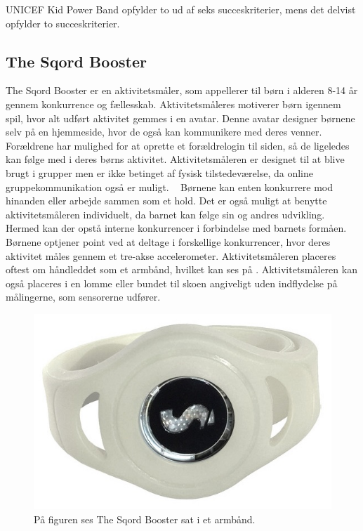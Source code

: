 UNICEF Kid Power Band opfylder to ud af seks succeskriterier, mens det delvist opfylder to succeskriterier.

\subsection{The Sqord Booster}
The Sqord Booster er en aktivitetsmåler, som appellerer til børn i alderen 8-14 år gennem konkurrence og fællesskab. Aktivitetsmåleres motiverer børn igennem spil, hvor alt udført aktivitet gemmes i en avatar. Denne avatar designer børnene selv på en hjemmeside, hvor de også kan kommunikere med deres venner. Forældrene har mulighed for at oprette et forældrelogin til siden, så de ligeledes kan følge med i deres børns aktivitet. Aktivitetsmåleren er designet til at blive brugt i grupper men er ikke betinget af fysisk tilstedeværelse, da online gruppekommunikation også er muligt.%
~\citep{Sqord_family2015} Børnene kan enten konkurrere mod hinanden eller arbejde sammen som et hold. Det er også muligt at benytte aktivitetsmåleren individuelt, da barnet kan følge sin og andres udvikling. Hermed kan der opstå interne konkurrencer i forbindelse med barnets formåen. \citep{Sqord_family2015,Sqord_group2015} \\
Børnene optjener point ved at deltage i forskellige konkurrencer, hvor deres aktivitet måles gennem et tre-akse accelerometer. Aktivitetsmåleren placeres oftest om håndleddet som et armbånd, hvilket kan ses på . Aktivitetsmåleren kan også placeres i en lomme eller bundet til skoen angiveligt uden indflydelse på målingerne, som sensorerne udfører. \citep{Sqord_family2015}
\begin{figure}[H]
	\centering
	\includegraphics[scale=0.31]{figures/aProblemanalyse/sqord.JPG}
	\caption{På figuren ses The Sqord Booster sat i et armbånd. \citep{Sqord2016}}
	\label{fig:sqord}
\end{figure}
